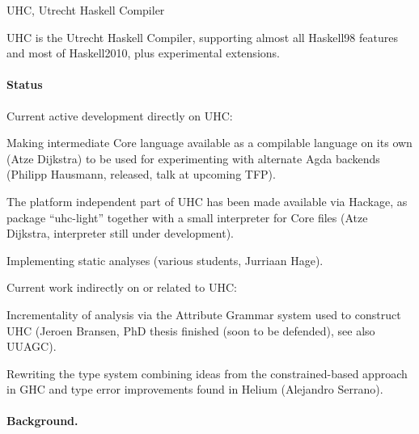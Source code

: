 \begin{hcarentry}{UHC, Utrecht Haskell Compiler}
\label{uhc}
\label{ehc}
\makeheader


UHC is the Utrecht Haskell Compiler, supporting almost all Haskell98 features and most of Haskell2010, plus
experimental extensions.

\paragraph{Status}

Current active development directly on UHC:
\begin{compactitem}
\item Making intermediate Core language available as a compilable language on its own (Atze Dijkstra) to be used for experimenting with alternate Agda backends (Philipp Hausmann, released, talk at upcoming TFP).
\item The platform independent part of UHC has been made available via Hackage, as package ``uhc-light'' together with a small interpreter for Core files (Atze Dijkstra, interpreter still under development).
\item Implementing static analyses (various students, Jurriaan Hage).
\end{compactitem}

Current work indirectly on or related to UHC:
\begin{compactitem}
\item Incrementality of analysis via the Attribute Grammar system used to construct UHC (Jeroen Bransen, PhD thesis finished (soon to be defended), see also UUAGC).
\item Rewriting the type system combining ideas from the constrained-based approach in GHC and type error improvements found in Helium (Alejandro Serrano).
\end{compactitem}

\paragraph{Background.}


\end{hcarentry}
